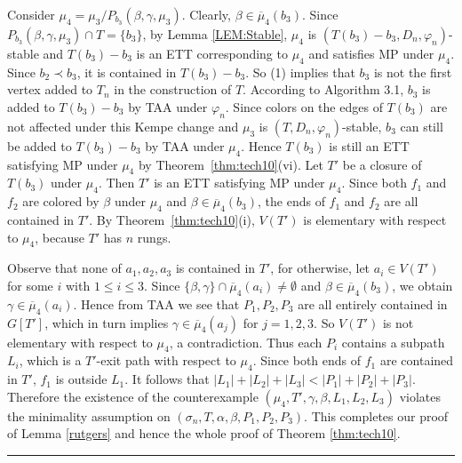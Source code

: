 \documentclass[11pt]{article}
\def\qed{\hfill \rule{4pt}{7pt}}
\begin{document}
Consider $\mu_4=\mu_3/P_{b_3}(\beta, \gamma, \mu_3)$. Clearly, $\beta \in \overline{\mu}_4(b_3)$. Since $P_{b_3}(\beta, \gamma, \mu_3)\cap T=\{b_3\}$,
by Lemma \ref{LEM:Stable}, $\mu_4$ is $(T(b_3)-b_3, D_n,\varphi_n)$-stable and $T(b_3)-b_3$ is an ETT corresponding to $\mu_4$ and satisfies MP 
under $\mu_4$. Since $b_2\prec b_3$, it is contained in $T(b_3)-b_3$. So (1) implies that $b_3$ is not the first vertex added to $T_n$ 
in the construction of $T$. According to Algorithm 3.1, $b_3$ is added to $T(b_3)-b_3$ by TAA under 
$\varphi_{n}$. Since colors on the edges of $T(b_3)$ are not affected under this Kempe change and $\mu_3$ is $(T,D_n,\varphi_n)$-stable, 
$b_3$ can still be added to $T(b_3)-b_3$ by TAA under $\mu_4$. Hence $T(b_3)$ is still an ETT satisfying MP under $\mu_4$ by Theorem~\ref{thm:tech10}(vi). 
Let $T'$ be a closure of $T(b_3)$ under $\mu_4$. Then $T'$ is an ETT satisfying MP under $\mu_4$. Since both $f_1$ and $f_2$ are colored by $\beta$ 
under $\mu_4$ and $\beta \in \overline{\mu}_4(b_3)$, the ends of $f_1$ and $f_2$ are all contained in $T'$.  By Theorem~\ref{thm:tech10}(i), $V(T')$ 
is elementary with respect to $\mu_4$, because $T'$ has $n$ rungs. 

Observe that none of $a_1,a_2,a_3$ is contained in $T'$, for otherwise, let $a_i \in V(T')$ for some $i$
with $1\le i \le 3$. Since $\{\beta,\gamma\}\cap \overline{\mu}_4(a_i) \ne \emptyset$ and $\beta \in \overline{\mu}_4(b_3)$, 
we obtain $\gamma \in \overline{\mu}_4(a_i)$. Hence from TAA we see that $P_1,P_2,P_3$ are all entirely 
contained in $G[T']$, which in turn implies $\gamma \in \overline{\mu}_4(a_j)$ for $j=1,2,3$. So $V(T')$ is not 
elementary with respect to $\mu_4$, a contradiction. Thus each $P_i$ contains a subpath $L_i$, which is a $T'$-exit path 
with respect to $\mu_4$. Since both ends of $f_1$ are contained in $T'$, $f_1$ is outside $L_1$. It follows that $|L_1|+|L_2|+|L_3|<|P_1|+|P_2|+|P_3|$.
Therefore the existence of the counterexample $(\mu_4, T', \gamma, \beta, L_1,L_2,L_3)$ violates the minimality assumption on 
$(\sigma_n, T, \alpha, \beta, P_1,P_2,P_3)$. This completes our proof of Lemma \ref{rutgers} and hence the whole proof of Theorem \ref{thm:tech10}. \qed
\end{document}
